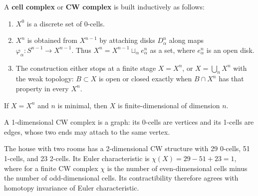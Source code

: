 \begin{definition}[CW complex]
\label{def:cell-complex}




A \textbf{cell complex} or \textbf{CW complex} is built inductively as follows:
\begin{enumerate}
\item[(1)] $X^0$ is a discrete set of 0-cells.
\item[(2)] $X^n$ is obtained from $X^{n-1}$ by attaching disks $D^n_\alpha$ along
maps $\varphi_\alpha:S^{n-1}\to X^{n-1}$. Thus
$X^n=X^{n-1}\sqcup_\alpha e^n_\alpha$ as a set, where $e^n_\alpha$ is an open disk.
\item[(3)] The construction either stops at a finite stage $X=X^n$, or
$X=\bigcup_nX^n$ with the weak topology: $B\subset X$ is open or closed exactly
when $B\cap X^n$ has that property in every $X^n$.
\end{enumerate}
\end{definition}

\begin{definition}
\label{def:dimension-cw-complex}



If $X=X^n$ and $n$ is minimal, then $X$ is finite-dimensional of dimension $n$.
\end{definition}

\begin{example}
\label{ex:cw-graph}


A 1-dimensional CW complex is a graph: its 0-cells are vertices and its 1-cells
are edges, whose two ends may attach to the same vertex.
\end{example}

\begin{example}
\label{ex:house-two-rooms-euler-characteristic}

The house with two rooms has a 2-dimensional CW structure with 29 0-cells, 51 1-cells,
and 23 2-cells. Its Euler characteristic is
$\chi(X)=29-51+23=1$, where for a finite CW complex $\chi$ is the number of
even-dimensional cells minus the number of odd-dimensional cells. Its contractibility
therefore agrees with homotopy invariance of Euler characteristic.
\end{example}

